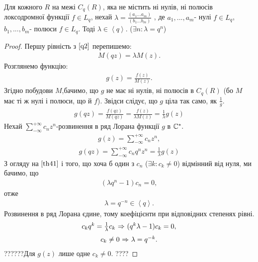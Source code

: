 \documentclass[12pt,a4paper]{article}
\begin{document}
\begin{thm}
Для кожного $R$ на межі $C_{q}(R)$, яка не містить ні нулів, ні полюсів локсодромної функції $f\in L_{q}$, нехай $\lambda=\frac{(a_{1}...a_{m})}{(b_{1}...b_{m})}$ , де $a_{1},...,a_{m}$- нулі $f\in L_{q}$, $b_{1},...,b_{m}$- полюси $f\in L_{q}$. Тоді $\lambda\in \left \langle q \right \rangle$. ($ \exists n:\lambda =q^{n}$)
\end{thm}
\begin{proof}
Першу рівність з $\eqref{q2}$ перепишемо:
\[\begin{array}{l}
 M(qz)=\lambda M(z).
 \end{array}\]
 Розглянемо функцію:
 \[\begin{array}{l}
 g(z)=\frac{f(z)}{M(z)}.
  \end{array}\]
  Згідно побудови $M$,бачимо, що $g$ не має ні нулів, ні полюсів в $C_{q}(R)$ (бо $M$ має ті ж нулі і полюси, що й $f$). Звідси слідує, що $g$ ціла так само, як $\frac{1}{g}$.
\begin{equation}\label{th41}
\begin{array}{l}
g(qz)=\frac{f(qz)}{M(qz)}=\frac{f(z)}{\lambda M(z)}=\frac{1}{\lambda}g(z)
\end{array}
\end{equation}
Нехай $\sum_{-\infty}^{+\infty}c_{n}z^{n}$-розвинення в ряд Лорана функції $g$ в $\mathbb{C}^{*}.\\$
 \[\begin{array}{l}
g(z)=\sum_{-\infty}^{+\infty}c_{n}z^{n},
 \end{array}\]
 \[\begin{array}{l}
 g(qz)=\sum_{-\infty}^{+\infty}c_{n}q^{n}z^{n}=\frac{1}{\lambda}g(z)
  \end{array}\]
З огляду на $\eqref {th41} $ і того, що хоча б один з $c_{n}$ ($\exists k: c_{k}\neq 0$) відмінний від нуля, ми бачимо, що 
 \[\begin{array}{l}
 (\lambda q^{n}-1)c_{n}=0,
  \end{array}\]
  отже 
 \[\begin{array}{l} 
 \lambda= q^{-n}\in \left \langle q \right \rangle .
 \end{array}\]
Розвинення в ряд Лорана єдине, тому коефіцієнти при відповідних степенях рівні.
\[\begin{array}{l}
c_{k}q^{k}=\frac{1}{\lambda} c_{k}$ $\Rightarrow$ $(q^{k}\lambda -1)c_{k}=0,
 \end{array}\]
\[\begin{array}{l}
c_{k}\neq 0$ $\Rightarrow$  $\lambda=q^{-k}.
 \end{array}\]
??????Для $g(z)$ лише одне $ c_{k}\neq 0$. ????
\end{proof}
\[\begin{array}{l}
\end{array} \]
\end{document}
